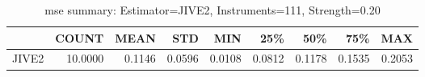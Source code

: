 \begin{table}[ht]
\centering
\caption{mse summary: Estimator=JIVE2, Instruments=111, Strength=0.20}
\begin{tabular}{lrrrrrrrr}
\toprule
 & COUNT & MEAN & STD & MIN & 25\% & 50\% & 75\% & MAX \\
\midrule
JIVE2 & 10.0000 & 0.1146 & 0.0596 & 0.0108 & 0.0812 & 0.1178 & 0.1535 & 0.2053 \\
\bottomrule
\end{tabular}
\end{table}
